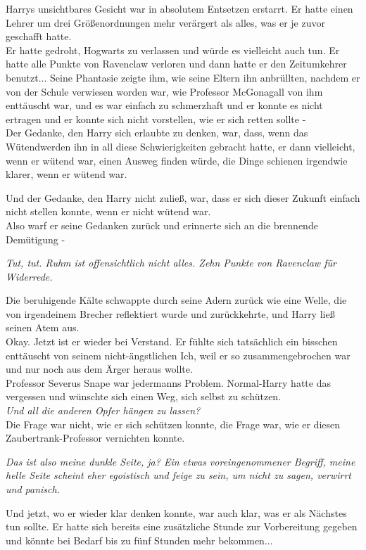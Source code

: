 {Harrys unsichtbares Gesicht war in absolutem Entsetzen erstarrt. Er hatte einen Lehrer um drei Größenordnungen mehr verärgert als alles, was er je zuvor geschafft hatte.\\ Er hatte gedroht, Hogwarts zu verlassen und würde es vielleicht auch tun. Er hatte alle Punkte von Ravenclaw verloren und dann hatte er den Zeitumkehrer benutzt... Seine Phantasie zeigte ihm, wie seine Eltern ihn anbrüllten, nachdem er von der Schule verwiesen worden war, wie Professor McGonagall von ihm enttäuscht war, und es war einfach zu schmerzhaft und er konnte es nicht ertragen und er konnte sich nicht vorstellen, wie er sich retten sollte -\\ Der Gedanke, den Harry sich erlaubte zu denken, war, dass, wenn das Wütendwerden ihn in all diese Schwierigkeiten gebracht hatte, er dann vielleicht, wenn er wütend war, einen Ausweg finden würde, die Dinge schienen irgendwie klarer, wenn er wütend war.

Und der Gedanke, den Harry nicht zuließ, war, dass er sich dieser Zukunft einfach nicht stellen konnte, wenn er nicht wütend war.\\ Also warf er seine Gedanken zurück und erinnerte sich an die brennende Demütigung -

\emph{Tut, tut. Ruhm ist offensichtlich nicht alles. Zehn Punkte von Ravenclaw für Widerrede.}

Die beruhigende Kälte schwappte durch seine Adern zurück wie eine Welle, die von irgendeinem Brecher reflektiert wurde und zurückkehrte, und Harry ließ seinen Atem aus.\\ Okay. Jetzt ist er wieder bei Verstand. Er fühlte sich tatsächlich ein bisschen enttäuscht von seinem nicht-ängstlichen Ich, weil er so zusammengebrochen war und nur noch aus dem Ärger heraus wollte.\\ Professor Severus Snape war jedermanns Problem. Normal-Harry hatte das vergessen und wünschte sich einen Weg, sich selbst zu schützen.\\ \emph{Und all die anderen Opfer hängen zu lassen?}\\ Die Frage war nicht, wie er sich schützen konnte, die Frage war, wie er diesen Zaubertrank-Professor vernichten konnte.

\emph{Das ist also meine dunkle Seite, ja? Ein etwas voreingenommener Begriff, meine helle Seite scheint eher egoistisch und feige zu sein, um nicht zu sagen, verwirrt und panisch.}

Und jetzt, wo er wieder klar denken konnte, war auch klar, was er als Nächstes tun sollte. Er hatte sich bereits eine zusätzliche Stunde zur Vorbereitung gegeben und könnte bei Bedarf bis zu fünf Stunden mehr bekommen...

}
